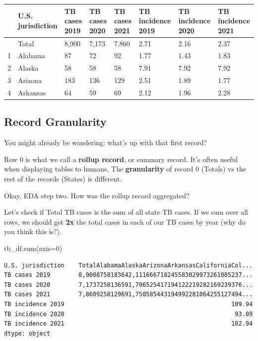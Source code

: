 \documentclass[
  letterpaper,
  DIV=11,
  numbers=noendperiod]{scrreprt}
\newenvironment{Shaded}{\begin{snugshade}}{\end{snugshade}}
\newcommand{\BuiltInTok}[1]{\textcolor[rgb]{0.00,0.23,0.31}{#1}}
\newcommand{\DecValTok}[1]{\textcolor[rgb]{0.68,0.00,0.00}{#1}}
\newcommand{\NormalTok}[1]{\textcolor[rgb]{0.00,0.23,0.31}{#1}}
\newcommand{\OperatorTok}[1]{\textcolor[rgb]{0.37,0.37,0.37}{#1}}
\begin{document}
\begin{longtable}[]{@{}llllllll@{}}
\toprule\noalign{}
& U.S. jurisdiction & TB cases 2019 & TB cases 2020 & TB cases 2021 & TB
incidence 2019 & TB incidence 2020 & TB incidence 2021 \\
\midrule\noalign{}
\endhead
\bottomrule\noalign{}
\endlastfoot
0 & Total & 8,900 & 7,173 & 7,860 & 2.71 & 2.16 & 2.37 \\
1 & Alabama & 87 & 72 & 92 & 1.77 & 1.43 & 1.83 \\
2 & Alaska & 58 & 58 & 58 & 7.91 & 7.92 & 7.92 \\
3 & Arizona & 183 & 136 & 129 & 2.51 & 1.89 & 1.77 \\
4 & Arkansas & 64 & 59 & 69 & 2.12 & 1.96 & 2.28 \\
\end{longtable}

\subsection{Record Granularity}\label{record-granularity}

You might already be wondering: what's up with that first record?

Row 0 is what we call a \textbf{rollup record}, or summary record. It's
often useful when displaying tables to humans. The \textbf{granularity}
of record 0 (Totals) vs the rest of the records (States) is different.

Okay, EDA step two. How was the rollup record aggregated?

Let's check if Total TB cases is the sum of all state TB cases. If we
sum over all rows, we should get \textbf{2x} the total cases in each of
our TB cases by year (why do you think this is?).

\begin{Shaded}
\begin{Highlighting}[]
\NormalTok{tb\_df.}\BuiltInTok{sum}\NormalTok{(axis}\OperatorTok{=}\DecValTok{0}\NormalTok{)}
\end{Highlighting}
\end{Shaded}

\begin{verbatim}
U.S. jurisdiction    TotalAlabamaAlaskaArizonaArkansasCaliforniaCol...
TB cases 2019        8,9008758183642,111666718245583029973261085237...
TB cases 2020        7,1737258136591,706525417194122219282169239376...
TB cases 2021        7,8609258129691,750585443194992281064255127494...
TB incidence 2019                                               109.94
TB incidence 2020                                                93.09
TB incidence 2021                                               102.94
dtype: object
\end{verbatim}
\end{document}
